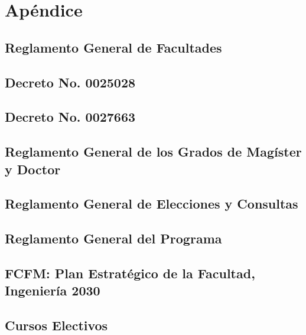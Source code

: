 \documentclass[11pt,fleqn]{book} %
\begin{document}
\appendix
{}
\chapter{Apéndice}

\section{Reglamento General de Facultades}\label{reg_gen_fac}


\section{Decreto No. 0025028}\label{dec25028}


\section{Decreto No. 0027663}\label{dec27663}


\section{Reglamento General de los Grados de Magíster y Doctor}\label{reg_mag_doc}


\section{Reglamento General de Elecciones y Consultas}\label{reg_elec_cons}


\section{Reglamento General del Programa}\label{reg_mirc}


\section{FCFM: Plan Estratégico de la Facultad, Ingeniería 2030}\label{fcfm_plan_2030}


\section{Cursos Electivos}\label{electivos}

\end{document}
